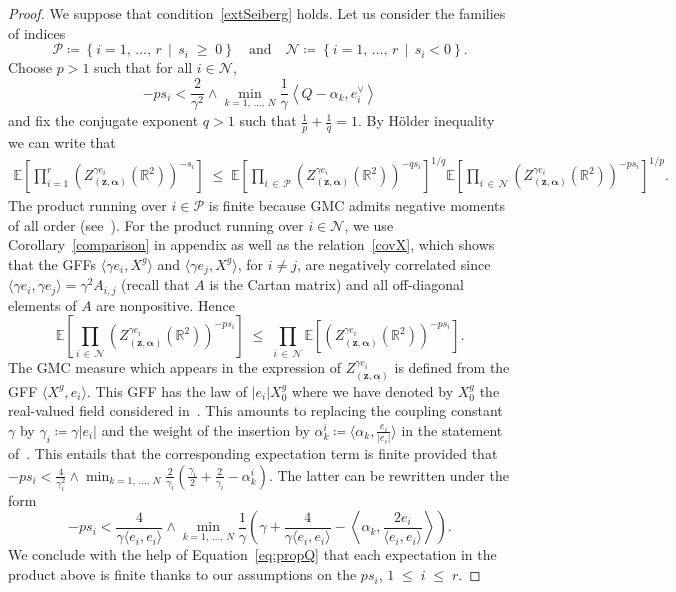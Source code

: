 \documentclass[AHL,Unicode,longabstracts,published]{cedram}
\renewcommand{\leq}{\;\leqslant\;}
\renewcommand{\geq}{\;\geqslant\;}
\newcommand{\clP}{\mathcal{P}}
\newcommand{\clN}{\mathcal{N}}
\newcommand{\R}{\mathbb{R}}
\newcommand{\E}{\mathbb{E}}
\newcommand{\ps}[1]{\langle #1 \rangle}
\newcommand{\norm}[1]{\left\lvert#1\right\rvert}
\begin{document}
\begin{proof}
We suppose that condition~\eqref{extSeiberg} holds. Let us consider the families of indices
\[
\clP\coloneqq \left\{i=1,\,\dots,\,r\,\middle|\,s_i\geq 0\right\}\quad \text{and}\quad \clN\coloneqq \left\{i=1,\,\dots,\,r\,\middle|\,s_i<0\right\}.
\]
Choose $p>1$ such that for all $i\in \clN$, 
\[
-p s_i< \frac{2}{\gamma^2}\wedge \min\limits_{k=1,\,\dots,\,N} \frac{1}{\gamma}\left\langle Q-\alpha_k,e_i^\vee\right\rangle
\]
and fix the conjugate exponent $q>1$ such that $\tfrac{1}{p}+\tfrac{1}{q}=1$. By H\"older inequality we can write that
\begin{align*}
\E \left [\prod_{i=1}^{r} \left(Z_{\left(\bm z,\bm \alpha\right)}^{\gamma e_i} \left(\R^2\right)\right)^{- s_i} \right] \leq \E \left[\prod_{i\,\in\,\clP} \left(Z_{\left(\bm z,\bm \alpha\right)}^{\gamma e_i} \left(\R^2\right)\right)^{- qs_i} \right]^{1/q} \E \left[\prod_{i\,\in\,\clN} \left(Z_{\left(\bm z,\bm \alpha\right)}^{\gamma e_i} \left(\R^2\right)\right)^{- p s_i} \right]^{1/p}\!.
\end{align*}
The product running over $i\in \clP$ is finite because GMC admits negative moments of all order (see~\cite[Theorem~2.12]{review}). For the product running over $i\in \clN$, we use Corollary~\ref{comparison} in appendix as well as the relation~\eqref{covX}, which shows that the GFFs $\langle \gamma e_i,X^g\rangle$ and $\langle \gamma e_j,X^g\rangle$, for $i\not=j$, are negatively correlated since $\langle \gamma e_i,\gamma e_j\rangle=\gamma ^2A_{i,j}$ (recall that $A$ is the Cartan matrix) and all off-diagonal elements of $A$ are nonpositive. Hence
\begin{equation}\label{ineg1}
\E \left[\prod_{i\,\in\,\clN} \left(Z_{\left(\bm z,\bm \alpha\right)}^{\gamma e_i} \left(\R^2\right)\right)^{- p s_i} \right] \leq \prod_{i\,\in\,\clN} \E \left[\left(Z_{\left(\bm z,\bm \alpha\right)}^{\gamma e_i}\left(\R^2\right)\right)^{- p s_i} \right].
\end{equation}
The GMC measure which appears in the expression of $Z_{(\bm z,\bm \alpha)}^{\gamma e_i}$ is defined from the GFF $\ps{X^g,e_i}$. This GFF has the law of $\norm{e_i}X^g_0$ where we have denoted by $X^g_0$ the real-valued field considered in~\cite[Lemma~A.1]{DKRV}. This amounts to replacing the coupling constant $\gamma$ by $\gamma_i\coloneqq \gamma\norm{e_i}$ and the weight of the insertion by $\alpha_k^i\coloneqq \ps{\alpha_k,\frac{e_i}{\norm{e_i}}}$ in the statement of~\cite[Lemma~A.1]{DKRV}. This entails that the corresponding expectation term is finite provided that $-ps_i < \frac{4}{\gamma_i^2}\wedge \min_{k=1,\,\dots,\,N} \frac{2}{\gamma_i}(\frac{\gamma_i}2+\frac2{\gamma_i}-\alpha_k^i)$. The latter can be rewritten under the form
\[
-ps_i < \frac{4}{\gamma \ps{e_i,e_i}}\wedge \min_{k=1,\,\dots,\,N} \frac{1}{\gamma}\left(\gamma+\frac4{\gamma\ps{e_i,e_i}}-\left\langle\alpha_k,\frac{2e_i}{\ps{e_i,e_i}}\right\rangle\right).
\]
We conclude with the help of Equation~\eqref{eq:propQ} that each expectation in the product above is finite thanks to our assumptions on the $ps_i$, $1\leq i\leq r$.


\end{proof}
\end{document}
